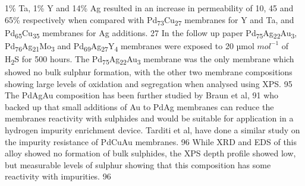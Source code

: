1\% Ta, 1\% Y and 14\% Ag resulted in an increase in permeability of 10, 45 and 65\% 
respectively when compared with Pd\textsubscript{73}Cu\textsubscript{27} membranes for 
Y and Ta, and Pd\textsubscript{65}Cu\textsubscript{35} membranes for Ag additions. 27 
In the follow up paper Pd\textsubscript{75}Ag\textsubscript{22}Au\textsubscript{3},
Pd\textsubscript{76}Ag\textsubscript{21}Mo\textsubscript{3} and Pd\textsubscript{69}Ag\textsubscript{27}Y\textsubscript{4} 
membranes were exposed to 20 µmol $mol^{-1}$ of H\textsubscript{2}S for 500 hours. 
The Pd\textsubscript{75}Ag\textsubscript{22}Au\textsubscript{3} membrane was the only 
membrane which showed no bulk sulphur formation, with the other two membrane compositions 
showing large levels of oxidation and segregation when analysed using XPS. 95 The 
PdAgAu composition has been further studied by Braun et al, 91 who backed up that small 
additions of Au to PdAg membranes can reduce the membranes reactivity with sulphides and 
would be suitable for application in a hydrogen impurity enrichment device. 
Tarditi et al, have done a similar study on the impurity resistance of PdCuAu membranes. 96 
While XRD and EDS of this alloy showed no formation of bulk sulphides, the XPS depth 
profile showed low, but measurable levels of sulphur showing that this composition has some 
reactivity with impurities. 96

